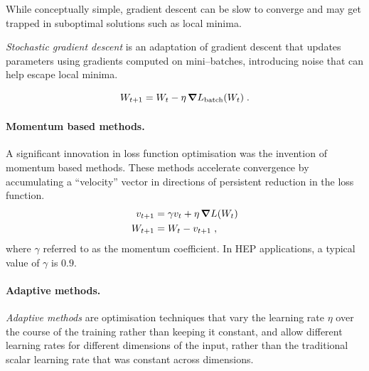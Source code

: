            While conceptually simple, gradient descent can be slow to converge and may get trapped in suboptimal solutions such as local minima.
            
            \begin{definition}
            
            \emph{Stochastic gradient descent} is an adaptation of gradient descent that updates parameters using gradients computed on mini--batches, introducing noise that can help escape local minima.
            
            \begin{equation}
            W_{t+1} = W_t - \eta\, \grad L_{\text{batch}}(W_t)\;.
            \end{equation}
            \end{definition}
            \paragraph{Momentum based methods.}
            
                A significant innovation in loss function optimisation was the invention of momentum based methods.
                These methods accelerate convergence by accumulating a ``velocity'' vector in directions of persistent reduction in the loss function.
                   \begin{align}
                       v_{t+1} &= \gamma v_t + \eta\,\grad L(W_t) \\
                       W_{t+1} &= W_t - v_{t+1}\;,
                   \end{align}
                   where \(\gamma\) referred to as the momentum coefficient.
                   In HEP applications, a typical value of \(\gamma\) is \(0.9\).
            
            \paragraph{Adaptive methods.}
            
                \begin{definition}
                \emph{Adaptive methods} are optimisation techniques that vary the learning rate \(\eta\) over the course of the training rather than keeping it constant, and allow different learning rates for different dimensions of the input, rather than the traditional scalar learning rate that was constant across dimensions.
            \end{definition}
                
